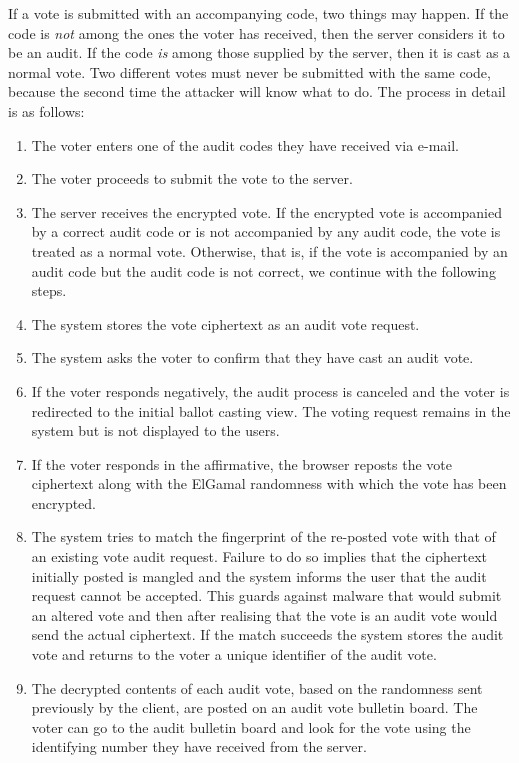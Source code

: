 \documentclass[letterpaper,10pt]{article}
\begin{document}
If a vote is submitted with an accompanying code, two things may happen.
If the code is \emph{not} among the ones the voter has received, then
the server considers it to be an audit.
If the code \emph{is} among those supplied by the server,
then it is cast as a normal vote.
Two different votes must never be submitted with the same code, because
the second time the attacker will know what to do. The process in
detail is as follows:
\begin{enumerate}
\item The voter enters one of the audit codes they have received via e-mail.
\item The voter proceeds to submit the vote to the server.
\item The server receives the encrypted vote. If the encrypted vote is
  accompanied by a correct audit code or is not accompanied by any
  audit code, the vote is treated as a normal vote. Otherwise, that
  is, if the vote is accompanied by an audit code but the audit code
  is not correct, we continue with the following steps.
\item The system stores the vote ciphertext as an audit vote request.
\item The system asks the voter to confirm that they have cast an
  audit vote.
\item If the voter responds negatively, the audit process is
  canceled and the voter is redirected to the initial ballot casting
  view. The voting request remains in the system but is not displayed
  to the users.
\item If the voter responds in the affirmative, the browser reposts
  the vote ciphertext along with the ElGamal randomness with which the
  vote has been encrypted. 
\item The system tries to match the fingerprint of the re-posted vote
  with that of an existing vote audit request. Failure to do so
  implies that the ciphertext initially posted is mangled and the
  system informs the user that the audit request cannot be accepted.
  This guards against malware that would submit an altered vote and
  then after realising that the vote is an audit vote would send the
  actual ciphertext. If the match succeeds the system stores the audit
  vote and returns to the voter a unique identifier of the audit vote.
\item The decrypted contents of each audit vote, based on the
  randomness sent previously by the client, are posted on an audit
  vote bulletin board. The voter can go to the audit bulletin board
  and look for the vote using the identifying number they have
  received from the server.
\end{enumerate}
\end{document}
